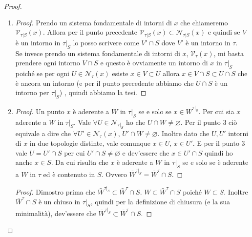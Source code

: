 \begin{proof}
\begin{enumerate}
\begin{proof}
		Rimane dunque $\{ U \cap S \; | \; U \in \mathcal{N}_\tau(x) \} \subset \mathcal{N}_{\tau|_S}(x)$. Sia $U \cap S$ allora devo dimostrare l'esistenza di un $A \subset U \cap S$ dove $x \in A$ e $A \in \tau|_S$. Per definizione di intorno esiste $A' \in \tau$ tale che $x \in A' \subset U$, quindi posso prendere $A = A' \cap S$ come aperto di $\tau|_S$ ed è dimostrato che $x \in A = A' \cap S \subset U \cap S$ e dunque è un intorno di $x$ in $\tau|_S$.
	\end{proof}
	\item 
	\begin{proof}
		Prendo un sistema fondamentale di intorni di $x$ che chiameremo $\mathcal{V}_{\tau|S}(x)$. Allora per il punto precedente $\mathcal{V}_{\tau|S}(x) \subset \mathcal{N}_{\tau|S}(x)$ e quindi se $V$ è un intorno in $\tau|_S$ lo posso scrivere come $V' \cap S$ dove $V'$ è un intorno in $\tau$.\\
		Se invece prendo un sistema fondamentale di intorni di $x$, $\mathcal{V}_{\tau}(x)$, mi basta prendere ogni intorno $V \cap S$ e questo è ovviamente un intorno di $x$ in $\tau|_S$ poiché se per ogni $U \in \mathcal{N}_\tau(x)$ esiste $x \in V \subset U$ allora $x \in V\cap S \subset U \cap S$ che è ancora un intorno (e per il punto precedente abbiamo che $U \cap S$ è un intorno per $\tau|_S$) , quindi abbiamo la tesi. 
	\end{proof}
	\item
	\begin{proof}
		Un punto $x$ è aderente a $W$ in $\tau|_S$ se e solo se $x \in \bar{W}^{\tau|_S}$. Per cui sia $x$ aderente a $W$ in $\tau|_S$. Vale $\forall U \in \mathcal{N}_{\tau|_S}$ ho che $U \cap W \neq \varnothing$. Per il punto 3 ciò equivale a dire che $\forall U' \in \mathcal{N}_\tau(x)$, $U' \cap W \neq \varnothing$. Inoltre dato che $U, U'$ intorni di $x$ in due topologie distinte, vale comunque $x \in U$, $x \in U'$. E per il punto 3 vale $U = U' \cap S$ per cui $U' \cap S \neq \varnothing$ e dev'essere che $x \in U' \cap S$ quindi ho anche $x \in S$. Da cui risulta che $x$ è aderente a $W$ in $\tau|_S$  se e solo se è aderente a $W$ in $\tau$ ed è contenuto in $S$. Ovvero $\bar{W}^{\tau|_S} = \bar{W}^{\tau} \cap S$. 
	\end{proof} 
	\begin{proof}
		Dimostro prima che $\bar{W}^{\tau|_S} \subset \bar{W}^\tau \cap S$. $W \subset \bar{W}^\tau \cap S$ poiché $W \subset S$. Inoltre $\bar{W}^\tau \cap S$ è un chiuso in $\tau|_S$, quindi per la definizione di chiusura (e la sua minimalità), dev'essere che $\bar{W}^{\tau|_S} \subset \bar{W}^\tau \cap S$.

\end{proof}
\end{enumerate}
\end{proof}

